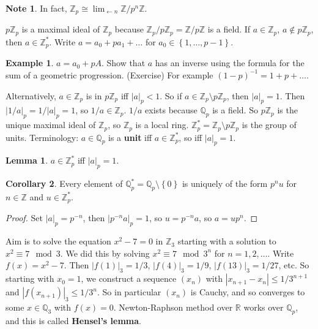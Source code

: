 \documentclass{article}
\newcommand{\Z}{\mathbb{Z}}
\newcommand{\Q}{\mathbb{Q}}
\newcommand{\R}{\mathbb{R}}
\newcommand{\rb}[1]{\left( #1 \right)}
\newcommand{\cb}[1]{\left\{ #1 \right\}}
\newcommand{\abs}[1]{\left\lvert #1 \right\rvert}
\theoremstyle{definition}\newtheorem{definition}{Definition}[section]
\theoremstyle{definition}\newtheorem{remark}[definition]{Remark}
\theoremstyle{definition}\newtheorem*{example}{Example}
\theoremstyle{definition}\newtheorem*{note}{Note}
\newtheorem{lemma}[definition]{Lemma}
\newtheorem{corollary}[definition]{Corollary}
\begin{document}
\begin{note}
In fact, $ \Z_p \cong \lim_{\leftarrow n} \Z / p^n\Z $.
\end{note}

$ p\Z_p $ is a maximal ideal of $ \Z_p $ because $ \Z_p / p\Z_p = \Z / p\Z $ is a field. If $ a \in \Z_p $, $ a \notin p\Z_p $, then $ a \in \Z_p^* $. Write $ a = a_0 + pa_1 + \dots $ for $ a_0 \in \cb{1, \dots, p - 1} $.

\begin{example}
$ a = a_0 + pA $. Show that $ a $ has an inverse using the formula for the sum of a geometric progression. (Exercise) For example $ \rb{1 - p}^{-1} = 1 + p + \dots $.
\end{example}

Alternatively, $ a \in \Z_p $ is in $ p\Z_p $ iff $ \abs{a}_p < 1 $. So if $ a \in \Z_p \setminus p\Z_p $, then $ \abs{a}_p = 1 $. Then $ \abs{1 / a}_p = 1 / \abs{a}_p = 1 $, so $ 1 / a \in \Z_p $. $ 1 / a $ exists because $ \Q_p $ is a field. So $ p\Z_p $ is the unique maximal ideal of $ \Z_p $, so $ \Z_p $ is a local ring. $ \Z_p^* = \Z_p \setminus p\Z_p $ is the group of units. Terminology: $ a \in \Q_p $ is a \textbf{unit} iff $ a \in \Z_p^* $, so iff $ \abs{a}_p = 1 $.

\begin{lemma}
$ a \in \Z_p^* $ iff $ \abs{a}_p = 1 $.
\end{lemma}

\begin{corollary}
Every element of $ \Q_p^* = \Q_p \setminus \cb{0} $ is uniquely of the form $ p^nu $ for $ n \in \Z $ and $ u \in \Z_p^* $.
\end{corollary}

\begin{proof}
Set $ \abs{a}_p = p^{-n} $, then $ \abs{p^{-n}a}_p = 1 $, so $ u = p^{-n}a $, so $ a = up^n $.
\end{proof}

Aim is to solve the equation $ x^2 - 7 = 0 $ in $ \Z_3 $ starting with a solution to $ x^2 \equiv 7 \mod 3 $. We did this by solving $ x^2 \equiv 7 \mod 3^n $ for $ n = 1, 2, \dots $. Write $ f\rb{x} = x^2 - 7 $. Then $ \abs{f\rb{1}}_3 = 1 / 3 $, $ \abs{f\rb{4}}_3 = 1 / 9 $, $ \abs{f\rb{13}}_3 = 1 / 27 $, etc. So starting with $ x_0 = 1 $, we construct a sequence $ \rb{x_n} $ with $ \abs{x_{n + 1} - x_n} \le 1 / 3^{n + 1} $ and $ \abs{f\rb{x_{n + 1}}}_3 \le 1 / 3^n $. So in particular $ \rb{x_n} $ is Cauchy, and so converges to some $ x \in \Q_3 $ with $ f\rb{x} = 0 $. Newton-Raphson method over $ \R $ works over $ \Q_p $, and this is called \textbf{Hensel's lemma}.
\end{document}
